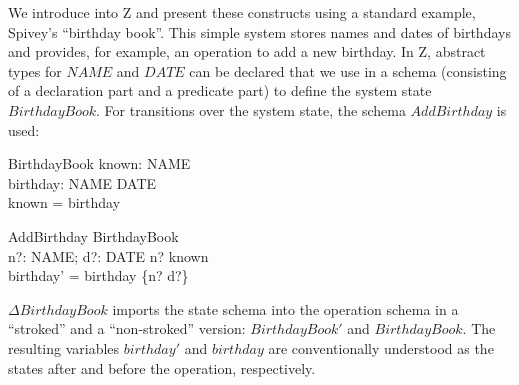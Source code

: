 We introduce into Z and present these constructs using a standard example,
Spivey's ``birthday book''.  This simple system stores names and dates of
birthdays and provides, for example, an operation to add a new birthday.  In Z,
abstract types for $NAME$ and $DATE$ can be declared that we use in a schema
(consisting of a declaration part and a predicate part) to define the system
state $BirthdayBook$.  For transitions over the system state, the schema
$AddBirthday$ is used:
\begin{zedgroup}
  \begin{schema}{BirthdayBook}
    known: \power NAME \\
    birthday: NAME \pfun DATE \\
    \where
    known = \dom birthday \\
  \end{schema}
  \begin{schema}{AddBirthday}
    \Delta BirthdayBook \\
    n?: NAME; d?: DATE
    \where
    n? \notin known \\
    birthday' = birthday \cup \{n? \mapsto d?\} \\
  \end{schema}
\end{zedgroup}
$\Delta BirthdayBook$ imports the state schema into the operation schema in a
``stroked'' and a ``non-stroked'' version: $BirthdayBook'$ and
$BirthdayBook$. The resulting variables $birthday'$ and $birthday$ are conventionally
understood as the states after and before the operation, respectively.

